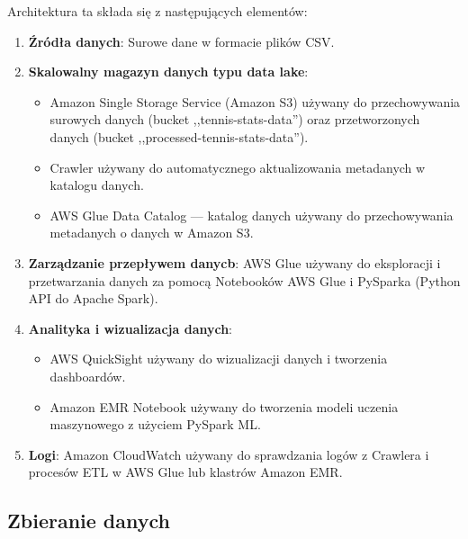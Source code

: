 \documentclass[12pt, a4paper]{article}
\begin{document}
Architektura ta składa się z następujących elementów:
\begin{enumerate}
    \item \textbf{Źródła danych}: Surowe dane w formacie plików CSV.
    \item \textbf{Skalowalny magazyn danych typu data lake}: 
    \begin{itemize}
        \item Amazon Single Storage Service (Amazon S3) używany do przechowywania surowych danych (bucket ,,tennis-stats-data'') oraz przetworzonych danych (bucket ,,processed-tennis-stats-data'').
        \item Crawler używany do automatycznego aktualizowania metadanych w katalogu danych.
        \item AWS Glue Data Catalog --- katalog danych używany do przechowywania metadanych o danych w Amazon S3.
    \end{itemize}
    \item \textbf{Zarządzanie przepływem danycb}: AWS Glue używany do eksploracji i przetwarzania danych za pomocą Notebooków AWS Glue i PySparka (Python API do Apache Spark).
    \item \textbf{Analityka i wizualizacja danych}: \begin{itemize}
        \item AWS QuickSight używany do wizualizacji danych i tworzenia dashboardów.
        \item Amazon EMR Notebook używany do tworzenia modeli uczenia maszynowego z użyciem PySpark ML.
    \end{itemize}
    \item \textbf{Logi}: Amazon CloudWatch używany do sprawdzania logów z Crawlera i procesów ETL w AWS Glue lub klastrów Amazon EMR.

\end{enumerate}


\subsection{Zbieranie danych}
\end{document}
